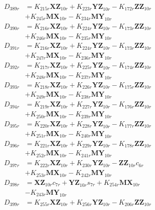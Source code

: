 \begin{align}
D_{389r} &= K_{215r}\mathbf{XZ}_{10r} + K_{223r}\mathbf{YZ}_{10r} - K_{172r}\mathbf{ZZ}_{10r}  \nonumber \\
&+ K_{245r}\mathbf{MX}_{10r} - K_{234r}\mathbf{MY}_{10r} \nonumber \\
D_{390r} &= K_{216r}\mathbf{XZ}_{10r} + K_{224r}\mathbf{YZ}_{10r} - K_{173r}\mathbf{ZZ}_{10r}  \nonumber \\
&+ K_{246r}\mathbf{MX}_{10r} - K_{235r}\mathbf{MY}_{10r} \nonumber \\
D_{391r} &= K_{216r}\mathbf{XZ}_{10r} + K_{224r}\mathbf{YZ}_{10r} - K_{173r}\mathbf{ZZ}_{10r}  \nonumber \\
&+ K_{247r}\mathbf{MX}_{10r} - K_{236r}\mathbf{MY}_{10r} \nonumber \\
D_{392r} &= K_{217r}\mathbf{XZ}_{10r} + K_{225r}\mathbf{YZ}_{10r} - K_{174r}\mathbf{ZZ}_{10r}  \nonumber \\
&+ K_{248r}\mathbf{MX}_{10r} - K_{237r}\mathbf{MY}_{10r} \nonumber \\
D_{393r} &= K_{218r}\mathbf{XZ}_{10r} + K_{226r}\mathbf{YZ}_{10r} - K_{175r}\mathbf{ZZ}_{10r}  \nonumber \\
&+ K_{249r}\mathbf{MX}_{10r} - K_{238r}\mathbf{MY}_{10r} \nonumber \\
D_{394r} &= K_{219r}\mathbf{XZ}_{10r} + K_{227r}\mathbf{YZ}_{10r} - K_{176r}\mathbf{ZZ}_{10r}  \nonumber \\
&+ K_{250r}\mathbf{MX}_{10r} - K_{239r}\mathbf{MY}_{10r} \nonumber \\
D_{395r} &= K_{220r}\mathbf{XZ}_{10r} + K_{228r}\mathbf{YZ}_{10r} - K_{177r}\mathbf{ZZ}_{10r}  \nonumber \\
&+ K_{251r}\mathbf{MX}_{10r} - K_{240r}\mathbf{MY}_{10r} \nonumber \\
D_{396r} &= K_{221r}\mathbf{XZ}_{10r} + K_{229r}\mathbf{YZ}_{10r} - K_{178r}\mathbf{ZZ}_{10r}  \nonumber \\
&+ K_{252r}\mathbf{MX}_{10r} - K_{241r}\mathbf{MY}_{10r} \nonumber \\
D_{397r} &= K_{222r}\mathbf{XZ}_{10r} + K_{230r}\mathbf{YZ}_{10r} - \mathbf{ZZ}_{10r}c_{6r}  \nonumber \\
&+ K_{253r}\mathbf{MX}_{10r} - K_{242r}\mathbf{MY}_{10r} \nonumber \\
D_{398r} &= \mathbf{XZ}_{10r}c_{7r} + \mathbf{YZ}_{10r}s_{7r} + K_{254r}\mathbf{MX}_{10r}  \nonumber \\
&- K_{243r}\mathbf{MY}_{10r} \nonumber \\
D_{399r} &= K_{255r}\mathbf{XZ}_{10r} + K_{256r}\mathbf{YZ}_{10r} - K_{206r}\mathbf{ZZ}_{10r}  \nonumber \\

\end{align}
